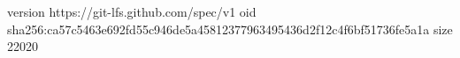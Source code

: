 version https://git-lfs.github.com/spec/v1
oid sha256:ca57c5463e692fd55c946de5a45812377963495436d2f12c4f6bf51736fe5a1a
size 22020

